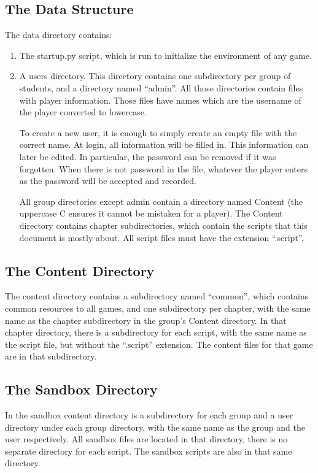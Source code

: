 \documentclass{article}
\begin{document}
\subsection{The Data Structure}
The data directory contains:
\begin{enumerate}
	\item The startup.py script, which is run to initialize the environment
		of any game.

	\item A users directory. This directory contains one subdirectory per
		group of students, and a directory named ``admin''. All those
		directories contain files with player information. Those files
		have names which are the username of the player converted to
		lowercase.

		To create a new user, it is enough to simply create an empty
		file with the correct name. At login, all information will be
		filled in. This information can later be edited. In particular,
		the password can be removed if it was forgotten.  When there is
		not password in the file, whatever the player enters as the
		password will be accepted and recorded.

		All group directories except admin contain a directory named
		Content (the uppercase C ensures it cannot be mistaken for a
		player). The Content directory contains chapter subdirectories,
		which contain the scripts that this document is mostly about.
		All script files must have the extension ``.script''.
\end{enumerate}

\subsection{The Content Directory}
The content directory contains a subdirectory named ``common'', which contains
common resources to all games, and one subdirectory per chapter, with the same
name as the chapter subdirectory in the group's Content directory. In that
chapter directory, there is a subdirectory for each script, with the same name
as the script file, but without the ``.script'' extension. The content files
for that game are in that subdirectory.

\subsection{The Sandbox Directory}
In the sandbox content directory is a subdirectory for each group and a user
directory under each group directory, with the same name as the group and the
user respectively. All sandbox files are located in that directory, there is no
separate directory for each script. The sandbox scripts are also in that same
directory.
\end{document}
